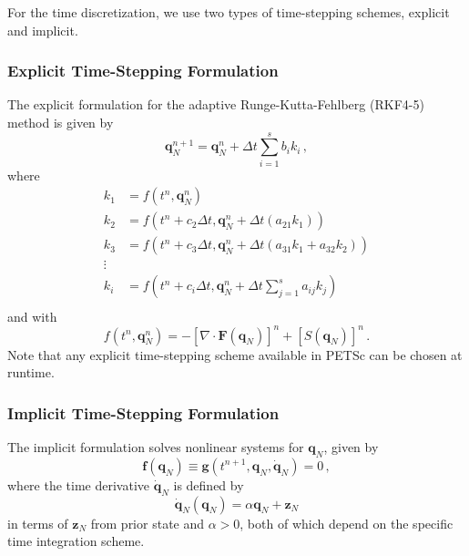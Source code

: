 For the time discretization, we use two types of time-stepping schemes, explicit and implicit.

\subsubsection{Explicit Time-Stepping Formulation}

The explicit formulation for the adaptive Runge-Kutta-Fehlberg (RKF4-5) method is given by
\begin{equation}
       \mathbf{q}_N^{n+1} = \mathbf{q}_N^n + \Delta t \sum_{i=1}^{s} b_i k_i \, ,
\end{equation}
where
\begin{equation}
       \begin{aligned}
          k_1 &= f(t^n, \mathbf{q}_N^n)\\
          k_2 &= f(t^n + c_2 \Delta t, \mathbf{q}_N^n + \Delta t (a_{21} k_1))\\
          k_3 &= f(t^n + c_3 \Delta t, \mathbf{q}_N^n + \Delta t (a_{31} k_1 + a_{32} k_2))\\
          \vdots&\\
          k_i &= f\left(t^n + c_i \Delta t, \mathbf{q}_N^n + \Delta t \sum_{j=1}^s a_{ij} k_j \right)\\
       \end{aligned}
\end{equation}
and with
\begin{equation}
       f(t^n, \mathbf{q}_N^n) = - [\nabla \cdot \mathbf{F}(\mathbf{q}_N)]^n + [S(\mathbf{q}_N)]^n \, .
\end{equation}
Note that any explicit time-stepping scheme available in PETSc can be chosen at runtime.

\subsubsection{Implicit Time-Stepping Formulation}

The implicit formulation solves nonlinear systems for $\mathbf q_N$, given by
\begin{equation}
       \mathbf f(\mathbf q_N) \equiv \mathbf g(t^{n+1}, \mathbf{q}_N, \mathbf{\dot{q}}_N) = 0 \, ,
       \label{eq:ts-implicit-ns}
\end{equation}
where the time derivative $\mathbf{\dot q}_N$ is defined by
\begin{equation}
      \mathbf{\dot{q}}_N(\mathbf q_N) = \alpha \mathbf q_N + \mathbf z_N
\end{equation}
in terms of $\mathbf z_N$ from prior state and $\alpha > 0$, both of which depend on the specific time integration scheme.

